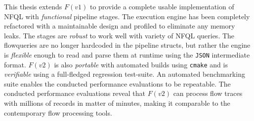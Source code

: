 This thesis extends $F(v1)$ to provide a complete usable implementation of
\ac{NFQL} with \emph{functional} pipeline stages. The execution engine has been
completely refactored with a maintainable design and profiled to eliminate any
memory leaks. The stages are \emph{robust} to work well with variety of
\ac{NFQL} queries. The flowqueries are no longer hardcoded in the pipeline
structs, but rather the engine is \emph{flexible} enough to read and parse them
at runtime using the \texttt{JSON} intermediate format. $F(v2)$ is also
\emph{portable} with automated builds using \texttt{cmake} and is
\emph{verifiable} using a full-fledged regression test-suite. An automated
benchmarking suite enables the conducted performance evaluations to be
repeatable. The conducted performance evaluations reveal that $F(v2)$ can
process flow traces with millions of records in matter of minutes, making it
comparable to the contemporary flow processing tools.


\endgroup
\vfill
